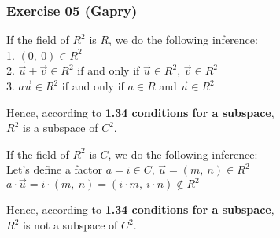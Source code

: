 \subsubsection*{Exercise 05 (Gapry)}

\begin{flushleft}
If the field of $R^2$ is $R$, we do the following inference: \\
1. $(0,\ 0) \in R^2$ \\
2. $\vec{u} + \vec{v} \in R^2$ if and only if 
   $\vec{u} \in R^2$, $\vec{v} \in R^2$ \\
3. $a\vec{u} \in R^2$ if and only if $a \in R$ and $\vec{u} \in R^2$

Hence, according to \textbf{1.34 conditions for a subspace}, \\
$R^2$ is a subspace of $C^2$.
\end{flushleft}

\begin{flushleft}
If the field of $R^2$ is $C$, we do the following inference: \\

Let's define a factor $a = i \in C$, $\vec{u} = (m,\ n) \in R^2$ \\
$a \cdot \vec{u} = i \cdot (m,\ n) = (i \cdot m,\ i \cdot n) \notin R^2$

Hence, according to \textbf{1.34 conditions for a subspace}, \\
$R^2$ is not a subspace of $C^2$.
\end{flushleft}